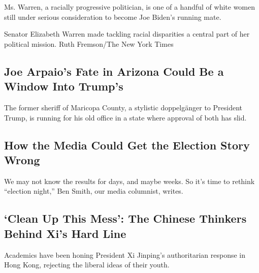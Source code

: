 Ms. Warren, a racially progressive politician, is one of a handful of
white women still under serious consideration to become Joe Biden's
running mate.

\href{/2020/08/02/us/politics/elizabeth-warren-biden-vice-president.html}{}

Senator Elizabeth Warren made tackling racial disparities a central part
of her political mission. Ruth Fremson/The New York Times

\href{/2020/08/02/us/politics/arizona-election-joe-arpaio.html}{}

\hypertarget{joe-arpaios-fate-in-arizona-could-be-a-window-into-trumps}{%
\subsection{Joe Arpaio's Fate in Arizona Could Be a Window Into
Trump's}\label{joe-arpaios-fate-in-arizona-could-be-a-window-into-trumps}}

The former sheriff of Maricopa County, a stylistic doppelgänger to
President Trump, is running for his old office in a state where approval
of both has slid.

\href{/2020/08/02/business/media/election-coverage.html}{}

\hypertarget{how-the-media-could-get-the-election-story-wrong}{%
\subsection{How the Media Could Get the Election Story
Wrong}\label{how-the-media-could-get-the-election-story-wrong}}

We may not know the results for days, and maybe weeks. So it's time to
rethink ``election night,'' Ben Smith, our media columnist, writes.

\href{/2020/08/02/world/asia/china-hong-kong-national-security-law.html}{}

\hypertarget{clean-up-this-mess-the-chinese-thinkers-behind-xis-hard-line}{%
\subsection{`Clean Up This Mess': The Chinese Thinkers Behind Xi's Hard
Line}\label{clean-up-this-mess-the-chinese-thinkers-behind-xis-hard-line}}

\href{/2020/08/02/world/asia/china-hong-kong-national-security-law.html}{}

Academics have been honing President Xi Jinping's authoritarian response
in Hong Kong, rejecting the liberal ideas of their youth.

